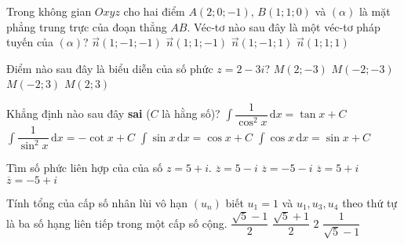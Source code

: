 \begin{ex}%
Trong không gian $Oxyz$ cho hai điểm $A(2;0;-1)$, $B(1;1;0)$ và $(\alpha)$ là mặt phẳng trung trực của đoạn thẳng $AB$. Véc-tơ nào sau đây là một véc-tơ pháp tuyến của $(\alpha)$?
\choice
{\True $\vec{n}(1;-1;-1)$}
{$\vec{n}(1;1;-1)$}
{$\vec{n}(1;-1;1)$}
{$\vec{n}(1;1;1)$}
\end{ex}

\begin{ex}%
Điểm nào sau đây là biểu diễn của số phức $z=2-3i$?
\choice
{\True $M(2;-3)$}
{$M(-2;-3)$}
{$M(-2;3)$}
{$M(2;3)$}
\end{ex}

\begin{ex}%
Khẳng định nào sau đây \textbf{sai} ($C$ là hằng số)?
\choice
{$\displaystyle\int\dfrac{1}{\cos^2x}\mathrm{\,d}x=\tan x+C$}
{$\displaystyle\int\dfrac{1}{\sin^2x}\mathrm{\,d}x=-\cot x+C$}
{\True $\displaystyle\int \sin x\mathrm{\,d}x=\cos x+C$}
{$\displaystyle\int \cos x\mathrm{\,d}x=\sin x+C$}
\end{ex}

\begin{ex}%
Tìm số phức liên hợp của của số $z=5+i$.
\choice
{\True $\overline{z}=5-i$}
{$\overline{z}=-5-i$}
{$\overline{z}=5+i$}
{$\overline{z}=-5+i$}
\end{ex}

\begin{ex}%
Tính tổng của cấp số nhân lùi vô hạn $(u_n)$ biết $u_1=1$ và $u_1, u_3, u_4$ theo thứ tự là ba số hạng liên tiếp trong một cấp số cộng.
\choice
{\True $\dfrac{\sqrt{5}-1}{2}$}
{$\dfrac{\sqrt{5}+1}{2}$}
{$2$}
{$\dfrac{1}{\sqrt{5}-1}$}
\end{ex}

